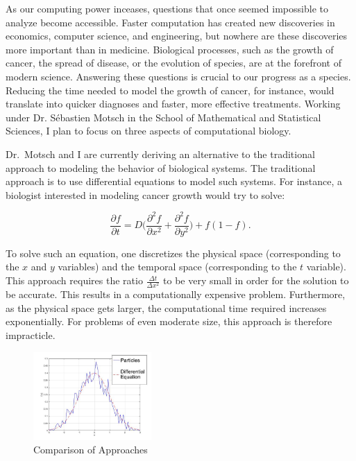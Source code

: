 \documentclass[8 pt]{article}
\begin{document}
As our computing power inceases, questions that once seemed impossible to analyze become accessible. Faster computation has created new discoveries in economics, computer science, and engineering, but nowhere are these discoveries more important than in medicine. Biological processes, such as the growth of cancer, the spread of disease, or the evolution of species, are at the forefront of modern science. Answering these questions is crucial to our progress as a species. Reducing the time needed to model the growth of cancer, for instance, would translate into quicker diagnoses and faster, more effective treatments. Working under Dr. S\'{e}bastien Motsch in the School of Mathematical and Statistical Sciences, I plan to focus on three aspects of computational biology.

 Dr.\ Motsch and I are currently deriving an alternative to the traditional approach to modeling the behavior of biological systems. The traditional approach is to use differential equations to model such systems. For instance, 
a biologist interested in modeling cancer growth would try to solve:

\begin{equation}
\frac{\partial f}{\partial t} = D\Big(\frac{\partial^2 f}{\partial x^2} + \frac{\partial^2 f}{\partial y^2}\Big)+ f(1-f).
\label{eq: Macro}
\end{equation}

To solve such an equation, one discretizes the physical space (corresponding to the $x$ and $y$ variables) and the temporal space (corresponding to the $t$ variable). This approach requires the ratio $\frac{\Delta t}{\Delta x^2}$ to be very small in order for the solution to be accurate. This results in a computationally expensive problem. Furthermore, as the physical space gets larger, the computational time required increases exponentially. For problems of even moderate size, this approach is therefore impracticle.\\


\begin{figure}
  \begin{center}
   \includegraphics[width=0.4\textwidth]{OriginsPic.jpg}
  \end{center}
  \caption{Comparison of Approaches}
\end{figure} 
\end{document}
